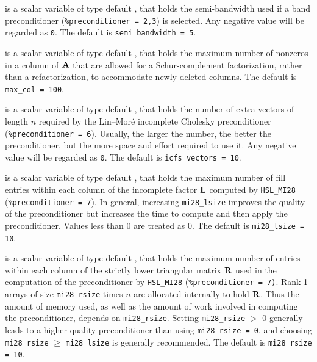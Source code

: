 \documentclass{galahad}
\begin{document}
\begin{description}
 is a scalar variable of type default \integer, that holds
the semi-bandwidth used if a band preconditioner ({\tt \%preconditioner = 2,3})
is selected. Any negative value will be regarded as {\tt 0}.
The default is {\tt semi\_bandwidth = 5}.



 is a scalar variable of type default \integer, that holds
the maximum number of nonzeros in a column of ${\mathbf{A}}$ that are allowed
for a Schur-complement factorization, rather than a refactorization, 
to accommodate newly deleted columns.
The default is {\tt max\_col = 100}.

 is a scalar variable of type default \integer, that holds
the number of extra vectors of length $n$ required by the Lin--Mor\'{e} 
incomplete Cholesky preconditioner ({\tt \%preconditioner = 6}).
Usually, the larger the number, the
better the preconditioner, but the more space and effort required to
use it. Any negative value will be regarded as {\tt 0}.
The default is {\tt icfs\_vectors = 10}.

 is a scalar variable of type default \integer, that holds
the maximum number of fill entries within each column of the incomplete
factor ${\mathbf{L}}$ computed by {\tt HSL\_MI28} ({\tt \%preconditioner = 7}).
In general, increasing {\tt mi28\_lsize} improves
the quality of the preconditioner but increases the time to compute
and then apply the preconditioner. Values less than 0 are treated as 0.
The default is {\tt mi28\_lsize = 10}.

 is a scalar variable of type default \integer, that holds
the maximum number of entries within each column of the strictly lower
triangular matrix ${\mathbf{R}}$ used in the computation of the preconditioner by
{\tt HSL\_MI28} ({\tt \%preconditioner = 7)}.
Rank-1 arrays of size {\tt mi28\_rsize} times $n$ are allocated internally
to hold ${\mathbf{R}}$. Thus the amount of memory used, as well as the amount of work
involved in computing the preconditioner, depends on {\tt mi28\_rsize}. 
Setting {\tt mi28\_rsize} $>$ 0 generally leads to a higher quality 
preconditioner than using {\tt mi28\_rsize = 0}, and choosing 
{\tt mi28\_rsize} $\geq$  {\tt mi28\_lsize} is generally recommended.
The default is {\tt mi28\_rsize = 10}.


\end{description}
\end{document}
